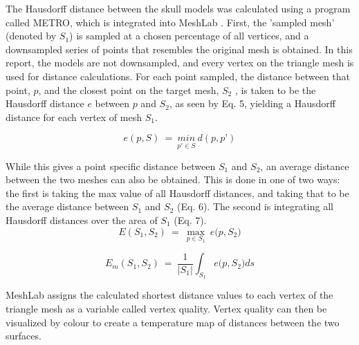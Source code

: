 \documentclass[a4paper]{article}
\begin{document}
The Hausdorff distance between the skull models was calculated using a program called METRO, which is integrated into MeshLab \citep{cignoni1998metro}. First, the 'sampled mesh' (denoted by ${ S }_{ 1 }$) is sampled at a chosen percentage of all vertices, and a downsampled series of points that resembles the original mesh is obtained. In this report, the models are not downsampled, and every vertex on the triangle mesh is used for distance calculations. For each point sampled, the distance between that point, $p$, and the closest point on the target mesh, ${ S }_{ 2 }$ , is taken to be the Hausdorff distance $e$ between $p$ and ${ S }_{ 2 }$, as seen by Eq. 5, yielding a Hausdorff distance for each vertex of mesh ${ S }_{ 1 }$.

\begin{equation}
e(p{ { ,S } }) \: = \: \underset { p'\in S }{ min }\: d(p,p’)
\end{equation}

While this gives a point specific distance between ${ S }_{ 1 }$ and ${ S }_{ 2 }$, an average distance between the two meshes can also be obtained. This is done in one of two ways: the first is taking the max value of all Hausdorff distances, and taking that to be the average distance between ${ S }_{ 1 }$ and ${ S }_{ 2 }$ (Eq. 6). The second is integrating all Hausdorff distances over the area of ${ S }_{ 1 }$ (Eq. 7).
\begin{equation}
E({ S }_{ 1 }{ { ,{ S }_{ 2 } } })\: =\: \max _{ p\in { S }_{ 1 } }{ \: e(p,{ S }_{ 2 } } )
\end{equation}

\begin{equation}
{ E }_{ m }({ S }_{ 1 },{ S }_{ 2 })\: =\: \frac { 1 }{ \left| { S }_{ 1 } \right|  } \int _{ { S }_{ 1 } }^{  }{ e(p,{ S }_{ 2 } } )ds
\end{equation}

MeshLab assigns the calculated shortest distance values to each vertex of the triangle mesh as a variable called vertex quality. Vertex quality can then be visualized by colour to create a temperature map of distances between the two surfaces.
\end{document}
